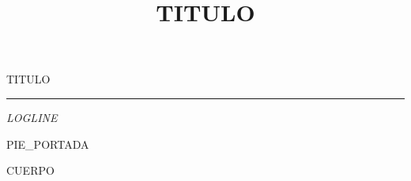 \documentclass[11pt,twoside,openright]{book}
\title{ {{TITULO}} }
\date{}
\begin{document}
\begin{titlepage}
\thispagestyle{empty}
\centering
\vspace*{0.18\textheight}

{\LARGE {{TITULO}} \par}

\vspace{1.4em}
{\rule{5em}{0.4pt}\par}
\vspace{1.6em}

\begin{minipage}{0.82\textwidth}
  \centering\itshape\small
  {{LOGLINE}}
\end{minipage}

\vfill
{\footnotesize {{PIE_PORTADA}} \par}
\vspace{0.06\textheight}
\end{titlepage}

\frontmatter
\pagestyle{empty}
\tableofcontents
\cleardoublepage

\mainmatter
{}

{{CUERPO}}
\end{document}
